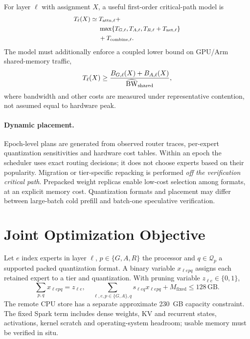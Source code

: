\documentclass[10pt,twocolumn]{article}
\begin{document}
For layer $\ell$ with assignment $X$, a useful first-order critical-path model is
\begin{equation}
\small
\begin{split}
T_\ell(X) \simeq\;& T_{\mathrm{attn},\ell} + \\
&\max\{T_{G,\ell},T_{A,\ell},T_{R,\ell}+T_{\mathrm{net},\ell}\}\\
&+T_{\mathrm{combine},\ell}.
\end{split}
\label{eq:critical}
\end{equation}
The model must additionally enforce a coupled lower bound on GPU/Arm shared-memory traffic,
\begin{equation}
\small
T_\ell(X)\geq \frac{B_{G,\ell}(X)+B_{A,\ell}(X)}{\widehat{\mathrm{BW}}_{\mathrm{shared}}},
\end{equation}
where bandwidth and other costs are measured under representative contention, not assumed equal to hardware peak.

\paragraph{Dynamic placement.} Epoch-level plans are generated from observed router traces, per-expert quantization sensitivities and hardware cost tables. Within an epoch the scheduler uses exact routing decisions; it does not choose experts based on their popularity. Migration or tier-specific repacking is performed \emph{off the verification critical path}. Prepacked weight replicas enable low-cost selection among formats, at an explicit memory cost. Quantization formats and placement may differ between large-batch cold prefill and batch-one speculative verification.

\section{Joint Optimization Objective}
Let $e$ index experts in layer $\ell$, $p\in\{G,A,R\}$ the processor and $q\in\mathcal Q_p$ a supported packed quantization format. A binary variable $x_{\ell epq}$ assigns each retained expert to a tier and quantization. With pruning variable $z_{\ell e}\in\{0,1\}$,
\begin{equation}
\sum_{p,q}x_{\ell epq}=z_{\ell e},\quad
\sum_{\ell,e,p\in\{G,A\},q}s_{\ell eq}x_{\ell epq}+M_{\mathrm{fixed}}\leq128\,\mathrm{GB}.
\end{equation}
The remote CPU store has a separate approximate 230~GB capacity constraint. The fixed Spark term includes dense weights, KV and recurrent states, activations, kernel scratch and operating-system headroom; usable memory must be verified in situ.
\end{document}
